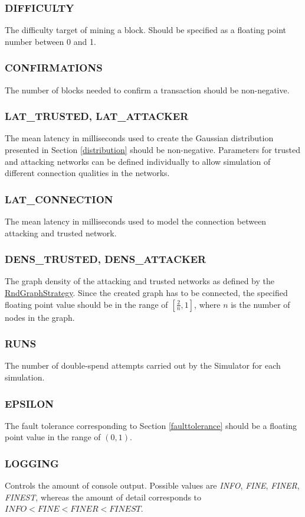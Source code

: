 \documentclass[a4paper,12pt,twoside]{report}
\begin{document}
\subsubsection{DIFFICULTY}
The difficulty target of mining a block. Should be specified as a floating point number between 0 and 1.
\subsubsection{CONFIRMATIONS}
The number of blocks needed to confirm a transaction should be non-negative.
\subsubsection{LAT\_TRUSTED, LAT\_ATTACKER}
The mean latency in milliseconds used to create the Gaussian distribution presented in Section \ref{distribution} should be non-negative. Parameters for trusted and attacking networks can be defined individually to allow simulation of different connection qualities in the networks.
\subsubsection{LAT\_CONNECTION}
The mean latency in milliseconds used to model the connection between attacking and trusted network.
\subsubsection{DENS\_TRUSTED, DENS\_ATTACKER}
The graph density of the attacking and trusted networks as defined by the \hyperref[rndgraphstrategy]{RndGraphStrategy}. Since the created graph has to be connected, the specified floating point value should be in the range of $[\frac{2}{n}, 1]$, where $n$ is the number of nodes in the graph.
\subsubsection{RUNS}
The number of double-spend attempts carried out by the Simulator for each simulation.
\subsubsection{EPSILON}
The fault tolerance corresponding to Section \ref{faulttolerance} should be a floating point value in the range of $(0, 1)$.
\subsubsection{LOGGING}
Controls the amount of console output. Possible values are \textit{INFO}, \textit{FINE}, \textit{FINER}, \textit{FINEST}, whereas the amount of detail corresponds to $\textit{INFO} < \textit{FINE} < \textit{FINER} < \textit{FINEST}$.
\end{document}
